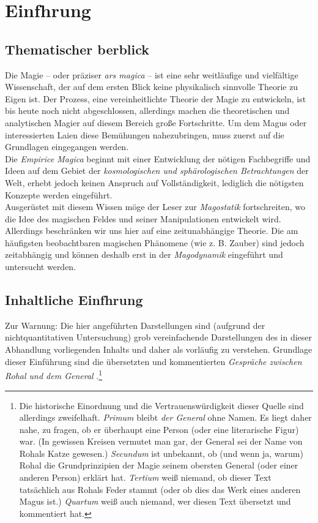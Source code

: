 \chapter[tocentry=Einführung, head=Einführung]{Einf\uech hrung}
\section[tocentry=Thematischer Überblick, head=Thematischer Überblick]{Thematischer \Uese berblick}
Die Magie -- oder präziser \emph{ars magica} -- ist eine sehr weitläufige und vielfältige Wissenschaft, der auf dem ersten Blick keine physikalisch sinnvolle Theorie zu Eigen ist. Der Prozess, eine vereinheitlichte Theorie der Magie zu entwickeln, ist bis heute noch nicht abgeschlossen, allerdings machen die theoretischen und analytischen Magier auf diesem Bereich große Fortschritte. Um dem Magus oder interessierten Laien diese Bemühungen nahezubringen, muss zuerst auf die Grundlagen eingegangen werden.\\
Die \emph{Empirice Magica} beginnt mit einer Entwicklung der nötigen Fachbegriffe und Ideen auf dem Gebiet der \emph{kosmologischen und sphärologischen Betrachtungen} der Welt, erhebt jedoch keinen Anspruch auf Vollständigkeit, lediglich die nötigsten Konzepte werden eingeführt.\\
Ausgerüstet mit diesem Wissen möge der Leser zur \emph{Magostatik} fortschreiten, wo die Idee des magischen Feldes und seiner Manipulationen entwickelt wird. Allerdings beschränken wir uns hier auf eine zeitunabhängige Theorie.
Die am häufigsten beobachtbaren magischen Phänomene (wie z. B. Zauber) sind jedoch zeitabhängig und können deshalb erst in der \emph{Magodynamik} eingeführt und untersucht werden.

\section[tocentry=Inhaltliche Einführung, head=Inhaltliche Einführung]{Inhaltliche Einf\uese hrung}
Zur Warnung: Die hier angeführten Darstellungen sind (aufgrund der nichtquantitativen Untersuchung) grob vereinfachende Darstellungen des in dieser Abhandlung vorliegenden Inhalts und daher als vorläufig zu verstehen. Grundlage dieser Einführung sind die übersetzten und kommentierten \emph{Gespräche zwischen Rohal und dem General} \cite{rohalfragen}.\footnote{Die historische Einordnung und die Vertrauenswürdigkeit dieser Quelle sind allerdings zweifelhaft. \emph{Primum} bleibt \emph{der General} ohne Namen. Es liegt daher nahe, zu fragen, ob er überhaupt eine Person (oder eine literarische Figur) war. (In gewissen Kreisen vermutet man gar, der General sei der Name von Rohals Katze gewesen.) \emph{Secundum} ist unbekannt, ob (und wenn ja, warum) Rohal die Grundprinzipien der Magie seinem obersten General (oder einer anderen Person) erklärt hat. \emph{Tertium} weiß niemand, ob dieser Text tatsächlich aus Rohals Feder stammt (oder ob dies das Werk eines anderen Magus ist.) \emph{Quartum} weiß auch niemand, wer diesen Text übersetzt und kommentiert hat.}


